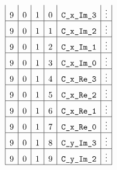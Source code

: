 \begin{figure}[h!]
\begin{adjustwidth}{-2cm}{-2cm}
{\[\begin{array}{|c|c|c|c|c|c|c|}
                               9 & 0      & 1      & 0           & \texttt{C\_x\_Im\_3}             & \vdots                                                                                                                        \\ \hline
                               9 & 0      & 1      & 1           & \texttt{C\_x\_Im\_2}               & \vdots                                                                                                                        \\ \hline
                               9 & 0      & 1      & 2           & \texttt{C\_x\_Im\_1}               & \vdots                                                                                                                        \\ \hline
                               9 & 0      & 1      & 3           & \texttt{C\_x\_Im\_0}              & \vdots                                                                                                                        \\ \hline
                               9 & 0      & 1      & 4           & \texttt{C\_x\_Re\_3}             & \vdots                                                                                                                        \\ \hline
                               9 & 0      & 1      & 5           & \texttt{C\_x\_Re\_2}               & \vdots                                                                                                                        \\ \hline
                               9 & 0      & 1      & 6           & \texttt{C\_x\_Re\_1}               & \vdots                                                                                                                        \\ \hline
                               9 & 0      & 1      & 7           & \texttt{C\_x\_Re\_0}              & \vdots                                                                                                                        \\ \hline
                               9 & 0      & 1      & 8           & \texttt{C\_y\_Im\_3}             & \vdots                                                                                                                        \\ \hline
                               9 & 0      & 1      & 9           & \texttt{C\_y\_Im\_2}               & \vdots                                                                                                                        \\ \hline

\end{array}\]}
\end{adjustwidth}
\end{figure}
